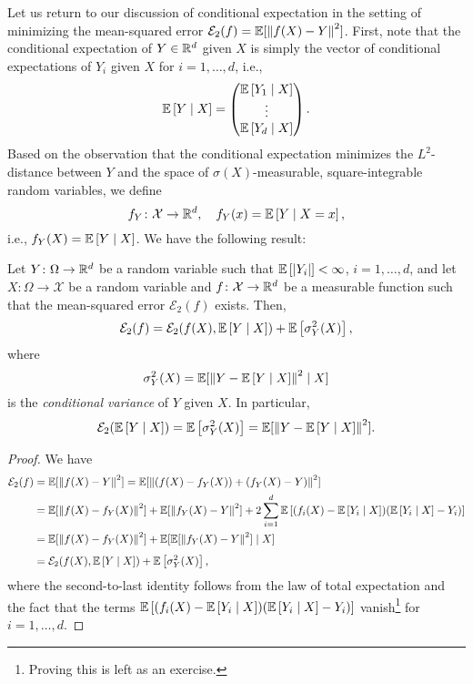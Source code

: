 Let us return to our discussion of conditional expectation in the setting of minimizing the mean-squared error $\mathcal{E}_2(f) = \mathbb{E}[\norm{f(X) - Y}^2]$. First, note that the conditional expectation of $Y \in \mathbb{R}^d$ given $X$ is simply the vector of conditional expectations of $Y_i$ given $X$ for $i = 1, \dots, d$, i.e.,
\[
    \mathbb{E}\left[Y \mathrel{|} X\right] = \begin{pmatrix}
        \mathbb{E}\left[Y_1 \mathrel{|} X\right] \\
        \vdots \\
        \mathbb{E}\left[Y_d \mathrel{|} X\right]
    \end{pmatrix}.
\]
Based on the observation that the conditional expectation minimizes the $L^2$-distance between $Y$ and the space of $\sigma(X)$-measurable, square-integrable random variables, we define
\[
    f_Y \colon \mathcal{X} \to \mathbb{R}^d, \quad f_Y(x) = \mathbb{E}\left[Y \mathrel{|} X = x\right],
\]
i.e., $f_Y(X) = \mathbb{E}\left[Y \mathrel{|} X\right]$. We have the following result:
\begin{proposition}
\label{prop: decomposition of mean-squared error}
Let $Y \colon \Omega \to \mathbb{R}^d$ be a random variable such that $\mathbb{E}\left[\abs{Y_i}\right] < \infty$, $i = 1, \dots, d$, and let $X \colon \Omega \to \mathcal{X}$ be a random variable and $f \colon \mathcal{X} \to \mathbb{R}^d$ be a measurable function such that the mean-squared error $\mathcal{E}_2(f)$ exists. Then,
\[
    \mathcal{E}_2(f) = \mathcal{E}_2(f(X), \mathbb{E}\left[Y \mathrel{|} X\right]) + \mathbb{E}\left[\sigma_Y^2(X)\right],
\]
where
\[
    \sigma_Y^2(X) = \mathbb{E}[\norm{Y - \mathbb{E}\left[Y \mathrel{|} X\right]}^2 \mathrel{|} X]
\]
is the \emph{conditional variance} of $Y$ given $X$. In particular,
\[
    \mathcal{E}_2(\mathbb{E}\left[Y \mathrel{|} X\right]) = \mathbb{E}\left[\sigma_Y^2(X)\right] = \mathbb{E}[\norm{Y - \mathbb{E}\left[Y \mathrel{|} X\right]}^2].
\]
\end{proposition}

\begin{proof}
We have
\begin{align*}
    \mathcal{E}_2(f) &= \mathbb{E}[\norm{f(X) - Y}^2] = \mathbb{E}[\norm{(f(X) - f_Y(X)) + (f_Y(X) - Y)}^2] \\
        &= \mathbb{E}[\norm{f(X) - f_Y(X)}^2] + \mathbb{E}[\norm{f_Y(X) - Y}^2] + 2 \sum_{i=1}^d \mathbb{E}\left[(f_i(X) - \mathbb{E}\left[Y_i \mathrel{|} X\right]) (\mathbb{E}\left[Y_i \mathrel{|} X\right] - Y_i)\right] \\
        &= \mathbb{E}[\norm{f(X) - f_Y(X)}^2] + \mathbb{E}[\mathbb{E}[\norm{f_Y(X) - Y}^2] \mathrel{|} X] \\[4pt]
        &= \mathcal{E}_2(f(X), \mathbb{E}\left[Y \mathrel{|} X\right]) + \mathbb{E}\left[\sigma_Y^2(X)\right],
\end{align*}
where the second-to-last identity follows from the law of total expectation and the fact that the terms $\mathbb{E}\left[(f_i(X) - \mathbb{E}\left[Y_i \mathrel{|} X\right]) (\mathbb{E}\left[Y_i \mathrel{|} X\right] - Y_i)\right]$ vanish\footnote{Proving this is left as an exercise.} for $i = 1, \dots, d$.
\end{proof}

